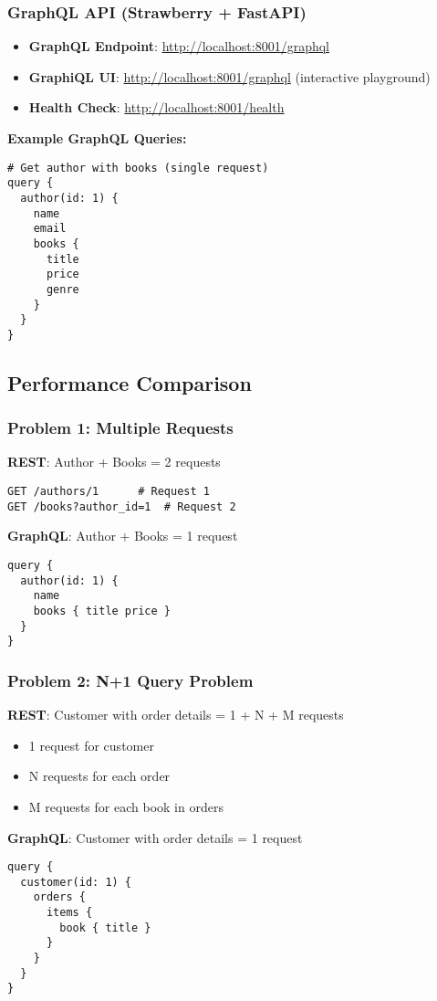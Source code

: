 \documentclass{article}
\begin{document}
\subsubsection{GraphQL API (Strawberry + FastAPI)}
\begin{itemize}
    \item \textbf{GraphQL Endpoint}: \url{http://localhost:8001/graphql}
    \item \textbf{GraphiQL UI}: \url{http://localhost:8001/graphql} (interactive playground)
    \item \textbf{Health Check}: \url{http://localhost:8001/health}
\end{itemize}
\textbf{Example GraphQL Queries:}
\begin{verbatim}
# Get author with books (single request)
query {
  author(id: 1) {
    name
    email
    books {
      title
      price
      genre
    }
  }
}
\end{verbatim}

\subsection{Performance Comparison}
\subsubsection{Problem 1: Multiple Requests}
\textbf{REST}: Author + Books = 2 requests
\begin{verbatim}
GET /authors/1      # Request 1
GET /books?author_id=1  # Request 2
\end{verbatim}
\textbf{GraphQL}: Author + Books = 1 request
\begin{verbatim}
query {
  author(id: 1) {
    name
    books { title price }
  }
}
\end{verbatim}

\subsubsection{Problem 2: N+1 Query Problem}
\textbf{REST}: Customer with order details = 1 + N + M requests
\begin{itemize}
    \item 1 request for customer
    \item N requests for each order
    \item M requests for each book in orders
\end{itemize}
\textbf{GraphQL}: Customer with order details = 1 request
\begin{verbatim}
query {
  customer(id: 1) {
    orders {
      items {
        book { title }
      }
    }
  }
}
\end{verbatim}
\end{document}
